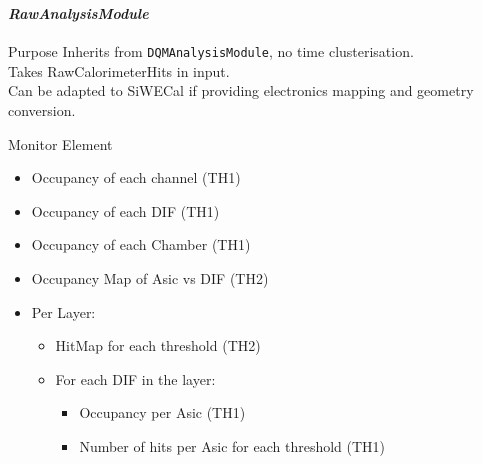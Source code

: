 \documentclass[8pt]{beamer}
\begin{document}
  \begin{frame}[containsverbatim]
  \frametitle{\secname}
  \framesubtitle{\textit{RawAnalysisModule}}

    \begin{block}{Purpose}
      Inherits from \verb|DQMAnalysisModule|, no time clusterisation. \\
      Takes RawCalorimeterHits in input. \\
      Can be adapted to SiWECal if providing electronics mapping and geometry conversion.
    \end{block}

  \begin{block}{Monitor Element}
  \begin{itemize}
      \item Occupancy of each channel (TH1)
      \item Occupancy of each DIF (TH1)
      \item Occupancy of each Chamber (TH1)
      \item Occupancy Map of Asic vs DIF (TH2)
      \item Per Layer:
      \begin{itemize}
        \item HitMap for each threshold (TH2)
        \item For each DIF in the layer:
          \begin{itemize}
            \item Occupancy per Asic (TH1)
            \item Number of hits per Asic for each threshold (TH1)
          \end{itemize}
      \end{itemize}
  \end{itemize}
  \end{block}
\end{frame}
\end{document}
